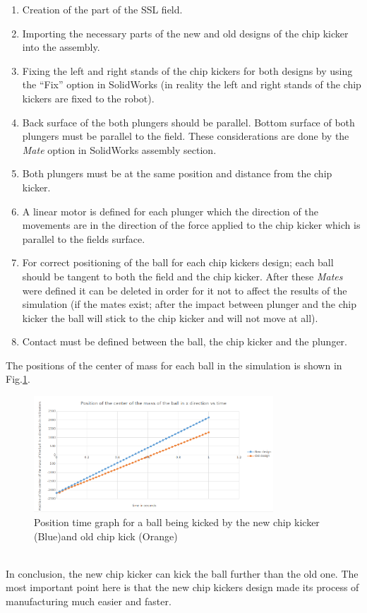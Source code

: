 \begin{enumerate}
  \item Creation of the part of the SSL field.
  \item Importing the necessary parts of the new and old designs of the chip kicker into the assembly.
  \item Fixing the left and right stands of the chip kickers for both designs by using the “Fix” option in SolidWorks (in reality the left and right stands of the chip kickers are fixed to the robot).
  \item Back surface of the both plungers should be parallel. Bottom surface of both plungers must be parallel to the field. These considerations are done by the \textit{Mate} option in SolidWorks assembly section.
  \item Both plungers must be at the same position and distance from the chip kicker.
  \item A linear motor is defined for each plunger which the direction of the movements are in the direction of the force applied to the chip kicker which is parallel to the fields surface.
  \item For correct positioning of the ball for each chip kickers design; each ball should be tangent to both the field and the chip kicker. After these \textit{Mates} were defined it can be deleted in order for it not to affect the results of the simulation (if the mates exist; after the impact between plunger and the chip kicker the ball will stick to the chip kicker and will not move at all).
  \item Contact must be defined between the ball, the chip kicker and the plunger.
\end{enumerate}

The positions of the center of mass for each ball in the simulation is shown in Fig.\ref{fig:NEWOLDPLOTBALL}.

\begin{figure}
	\centering
	\includegraphics[width=0.8\textwidth]{images/CHIP_POS_PLOT.png}
	\caption{Position time graph for a ball being kicked by the new chip kicker (Blue)and old chip kick (Orange)}
	\label{fig:NEWOLDPLOTBALL}
\end{figure}
\\

In conclusion, the new chip kicker can kick the ball further than the old one. The most important point here is that the new chip kickers design made its process of manufacturing much easier and faster. %



